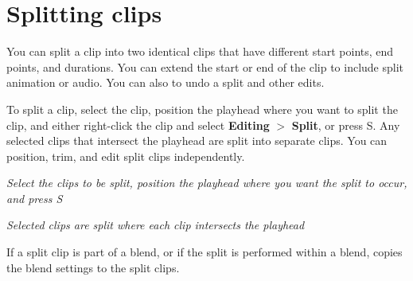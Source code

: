 \chapter{Splitting clips}
\hypertarget{md__library_2_package_cache_2com_8unity_8timeline_0d1_87_86_2_documentation_0i_2clp__split}{}\label{md__library_2_package_cache_2com_8unity_8timeline_0d1_87_86_2_documentation_0i_2clp__split}
\label{md__library_2_package_cache_2com_8unity_8timeline_0d1_87_86_2_documentation_0i_2clp__split_autotoc_md1127}%
%
 You can split a clip into two identical clips that have different start points, end points, and durations. You can extend the start or end of the clip to include split animation or audio. You can also  to undo a split and other edits.

To split a clip, select the clip, position the playhead where you want to split the clip, and either right-\/click the clip and select {\bfseries{Editing}} \texorpdfstring{$>$}{>} {\bfseries{Split}}, or press S. Any selected clips that intersect the playhead are split into separate clips. You can position, trim, and edit split clips independently.



{\itshape Select the clips to be split, position the playhead where you want the split to occur, and press S}



{\itshape Selected clips are split where each clip intersects the playhead}

If a split clip is part of a blend, or if the split is performed within a blend,  copies the blend settings to the split clips. 